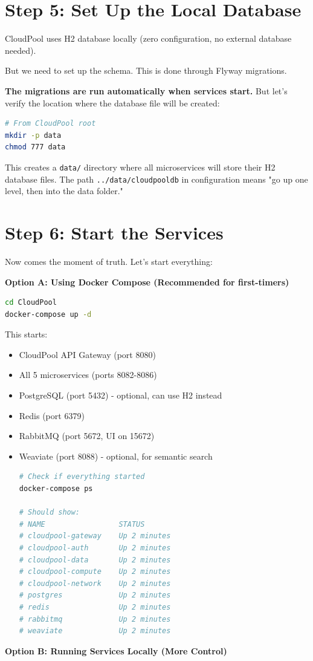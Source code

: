 \documentclass[11pt,a4paper]{report}
\begin{document}
\section{Step 5: Set Up the Local Database}


CloudPool uses H2 database locally (zero configuration, no external database needed).

But we need to set up the schema. This is done through Flyway migrations.

\textbf{The migrations are run automatically when services start.} But let's verify the location where the database file will be created:

\begin{lstlisting}[language=bash]
# From CloudPool root
mkdir -p data
chmod 777 data
\end{lstlisting}

This creates a \texttt{data/} directory where all microservices will store their H2 database files. The path \texttt{../data/cloudpooldb} in configuration means "go up one level, then into the data folder."


\section{Step 6: Start the Services}


Now comes the moment of truth. Let's start everything:

\textbf{Option A: Using Docker Compose (Recommended for first-timers)}

\begin{lstlisting}[language=bash]
cd CloudPool
docker-compose up -d
\end{lstlisting}

This starts:
\begin{itemize}
\item CloudPool API Gateway (port 8080)
\item All 5 microservices (ports 8082-8086)
\item PostgreSQL (port 5432) - optional, can use H2 instead
\item Redis (port 6379)
\item RabbitMQ (port 5672, UI on 15672)
\item Weaviate (port 8088) - optional, for semantic search

\begin{lstlisting}[language=bash]
# Check if everything started
docker-compose ps

# Should show:
# NAME                 STATUS
# cloudpool-gateway    Up 2 minutes
# cloudpool-auth       Up 2 minutes
# cloudpool-data       Up 2 minutes
# cloudpool-compute    Up 2 minutes
# cloudpool-network    Up 2 minutes
# postgres             Up 2 minutes
# redis                Up 2 minutes
# rabbitmq             Up 2 minutes
# weaviate             Up 2 minutes
\end{lstlisting}

\end{itemize}
\textbf{Option B: Running Services Locally (More Control)}
\end{document}
